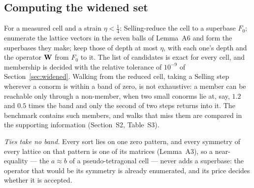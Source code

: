 \subsection{Computing the widened set}
\label{sec:snap}
For a measured cell and a strain $\eta<\frac14$: Selling-reduce the cell to a superbase $F_0$; enumerate the lattice vectors in the seven balls of Lemma~A6 and form the superbases they make; keep those of depth at most $\eta$, with each one's depth and the operator $\Wop$ from $F_0$ to it. The list of candidates is exact for every cell, and membership is decided with the relative tolerance of $10^{-9}$ of Section~\ref{sec:widened}. Walking from the reduced cell, taking a Selling step wherever a conorm is within a band of zero, is not exhaustive: a member can be reachable only through a non-member, when two small conorms lie at, say, $1.2$ and $0.5$ times the band and only the second of two steps returns into it. The benchmark contains such members, and walks that miss them are compared in the supporting information (Section~S2, Table~S3).

\emph{Ties take no band.} Every sort lies on one zero pattern, and every symmetry of every lattice on that pattern is one of its matrices (Lemma~A3), so a near-equality --- the $a\approx b$ of a pseudo-tetragonal cell --- never adds a superbase: the operator that would be its symmetry is already enumerated, and its price decides whether it is accepted.

